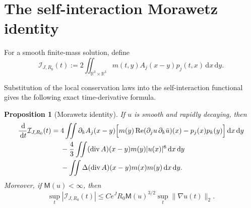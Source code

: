 \documentclass{interact}
\numberwithin{equation}{section}
\theoremstyle{plain}
\newtheorem{proposition}[theorem]{Proposition}
\theoremstyle{definition}
\theoremstyle{remark}
\newcommand{\R}{\mathbb R}
\newcommand{\Rea}{\operatorname{Re}}
\newcommand{\M}{\mathsf M}
\newcommand{\dd}{\,\mathrm d}
\begin{document}
\section{The self-interaction Morawetz identity}

For a smooth finite-mass solution, define
\begin{equation}\label{eq:Morawetz-functional}
 \mathcal I_{J,R_0}(t)
 :=2\iint_{\R^3\times\R^3}
 m(t,y)A_j(x-y)p_j(t,x)\dd x\dd y.
\end{equation}

Substitution of the local conservation laws into the self-interaction functional gives the following exact time-derivative formula.

\begin{proposition}[Morawetz identity]\label{prop:exact-Morawetz}
If $u$ is smooth and rapidly decaying, then
\begin{align}
 \frac{\dd}{\dd t}\mathcal I_{J,R_0}(t)
 ={}&4\iint \partial_kA_j(x-y)
 \Bigl[
 m(y)\Rea(\partial_ju\,\partial_k\bar u)(x)
 -p_j(x)p_k(y)
 \Bigr]\dd x\dd y
 \notag\\
 &-\frac43\iint
 (\operatorname{div}A)(x-y)m(y)|u(x)|^6\dd x\dd y
 \notag\\
 &-\iint
 \Delta(\operatorname{div}A)(x-y)m(x)m(y)\dd x\dd y.
 \label{eq:exact-Morawetz-identity}
\end{align}
Moreover, if $\M(u)<\infty$, then
\begin{equation}\label{eq:Morawetz-endpoint}
 \sup_t|\mathcal I_{J,R_0}(t)|
 \le Ce^JR_0\M(u)^{3/2}
 \sup_t\|\nabla u(t)\|_2.
\end{equation}
\end{proposition}
\end{document}
